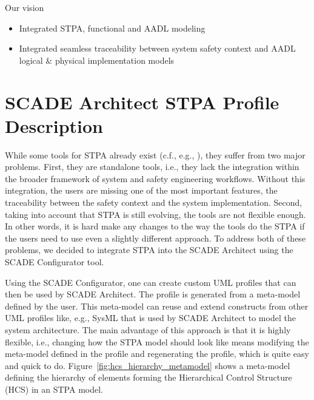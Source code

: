 \documentclass[conference]{IEEEtran}
\begin{document}
Our vision
\begin{itemize}

\item Integrated STPA, functional and AADL modeling

\item Integrated seamless traceability between system safety context and AADL logical \& physical implementation models 

\end{itemize}

\section{SCADE Architect STPA Profile Description}

While some tools for STPA already exist (c.f., e.g., \cite{xstampp}), they
suffer from two major problems. First, they are standalone tools, i.e., they
lack the integration within the broader framework of system and safety
engineering workflows. Without this integration, the users are missing one of
the most important features, the traceability between the safety context and the
system implementation. Second, taking into account that STPA is still evolving,
the tools are not flexible enough. In other words, it is hard make any changes
to the way the tools do the STPA if the users need to use even a slightly
different approach. To address both of these problems, we decided to integrate
STPA into the SCADE Architect using the SCADE Configurator tool.

Using the SCADE Configurator, one can create custom UML profiles that can then
be used by SCADE Architect. The profile is generated from a meta-model defined
by the user. This meta-model can reuse and extend constructs from other UML
profiles like, e.g., SysML that is used by SCADE Architect to model the system
architecture. The main advantage of this approach is that it is highly flexible,
i.e., changing how the STPA model should look like means modifying the
meta-model defined in the profile and regenerating the profile, which is quite
easy and quick to do. Figure~\ref{fig:hcs_hierarchy_metamodel} shows a
meta-model defining the hierarchy of elements forming the Hierarchical Control
Structure (HCS) in an STPA model.
\end{document}
